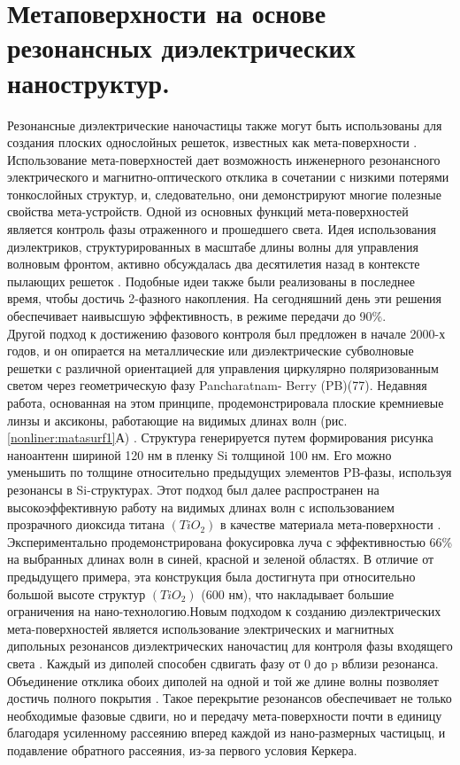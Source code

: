 \section{Метаповерхности на основе резонансных диэлектрических наноструктур.}
\hspace*{2mm}
Резонансные диэлектрические наночастицы также могут быть использованы для создания плоских однослойных решеток, известных как мета-поверхности \cite{yu2014flat}. Использование мета-поверхностей дает возможность инженерного резонансного электрического и магнитно-оптического отклика в сочетании с низкими потерями тонкослойных структур, и, следовательно, они демонстрируют многие полезные свойства мета-устройств. Одной из основных функций мета-поверхностей является контроль фазы отраженного и прошедшего света. Идея использования диэлектриков, структурированных в масштабе длины волны для управления волновым фронтом, активно обсуждалась два десятилетия назад в контексте пылающих решеток \cite{lalanne1999design}. Подобные идеи также были реализованы в последнее время, чтобы достичь 2-фазного накопления.  На сегодняшний день эти решения обеспечивает наивысшую эффективность, в режиме передачи до 90\%.
\\
\hspace*{2mm}
Другой подход к достижению фазового контроля был предложен в начале 2000-х годов, и он опирается на металлические или диэлектрические субволновые решетки с различной ориентацией для управления циркулярно поляризованным светом через геометрическую фазу Pancharatnam- Berry (PB)(77). Недавняя работа, основанная на этом принципе, продемонстрировала плоские кремниевые линзы и аксиконы, работающие на видимых длинах волн (рис.  \ref{nonliner:matasurf1}А) \cite{lin2014dielectric}. Структура генерируется путем формирования рисунка наноантенн шириной 120 нм в пленку Si толщиной 100 нм. Его можно уменьшить по толщине относительно предыдущих элементов PB-фазы, используя резонансы в Si-структурах. Этот подход был далее распространен на высокоэффективную работу на видимых длинах волн с использованием прозрачного диоксида титана $(TiO_{2})$ в качестве материала мета-поверхности \cite{DiffLimFoc}. Экспериментально продемонстрирована фокусировка луча с эффективностью 66\% на выбранных длинах волн в синей, красной и зеленой областях. В отличие от предыдущего примера, эта конструкция была достигнута при относительно большой высоте структур $(TiO_{2})$ (600 нм), что накладывает большие ограничения на нано-технологию.Новым подходом к созданию диэлектрических мета-поверхностей является использование электрических и магнитных дипольных резонансов диэлектрических наночастиц для контроля фазы входящего света \cite{shalaev2015high}. Каждый из диполей способен сдвигать фазу от 0 до p вблизи резонанса. Объединение отклика обоих диполей на одной и той же длине волны позволяет достичь полного покрытия \cite{decker2015high}. Такое перекрытие резонансов обеспечивает не только необходимые фазовые сдвиги, но и передачу мета-поверхности почти в единицу благодаря усиленному рассеянию вперед каждой из нано-размерных частицыц, и подавление обратного рассеяния, из-за первого условия Керкера.
